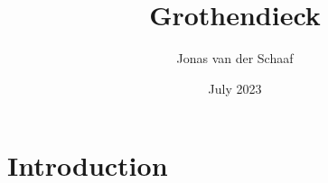 \documentclass{article}
\title{Grothendieck}
\author{Jonas van der Schaaf}
\date{July 2023}
\begin{document}
\maketitle

\section{Introduction}
\end{document}
